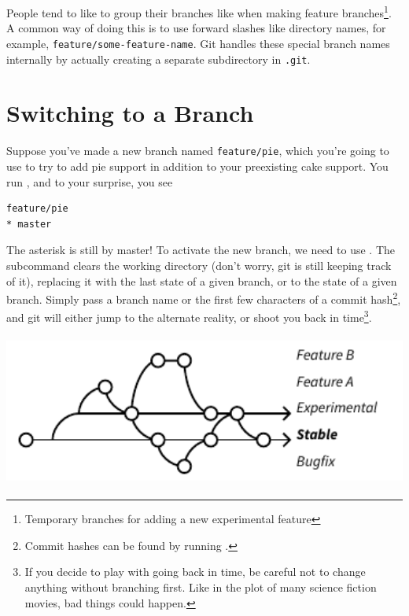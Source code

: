 \documentclass[11pt,letterpaper,twoside]{report}
\begin{document}
People tend to like to group their branches like when making feature
branches\footnote{Temporary branches for adding a new experimental feature}. A
common way of doing this is to use forward slashes like directory names, for
example, \texttt{feature/some-feature-name}. Git handles these special branch
names internally by actually creating a separate subdirectory in \texttt{.git}.

\section{Switching to a Branch}

Suppose you've made a new branch named \texttt{feature/pie}, which you're going
to use to try to add pie support in addition to your preexisting cake support.
You run , and to your surprise, you see

\begin{lstlisting}[numbers=none]
  feature/pie
* master
\end{lstlisting}

The asterisk is still by master! To activate the new branch, we need to use
. The subcommand clears the working directory (don't worry,
git is still keeping track of it), replacing it with the last state of a given
branch, or to the state of a given branch. Simply pass  a
branch name or the first few characters of a commit hash\footnote{Commit hashes
can be found by running .}, and git will either jump to the
alternate reality, or shoot you back in time\footnote{If you decide to play with
going back in time, be careful not to change anything without branching first.
Like in the plot of many science fiction movies, bad things could happen.}.

\vspace{\fill}
\begin{center}
\includegraphics[height=5cm]{resources/example_branching.pdf}
\end{center}
\vspace*{\fill}
\end{document}
